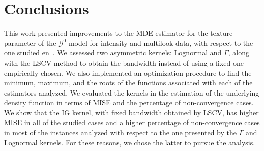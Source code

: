 \documentclass[twocolumn]{svjour3}
\begin{document}
	
	\section{Conclusions}
	\label{conclusion}
	
	This work presented improvements to the MDE estimator for the texture parameter of the $\mathcal{G}^0$ model for intensity and multilook data, with respect to the one studied en~\cite{gambini2015}. 
	We assessed two asymmetric kernels: Lognormal and $\Gamma$, along with the LSCV method to obtain the bandwidth instead of using a fixed one empirically chosen.
	We also implemented an optimization procedure to find the minimum, maximum, and the roots of the functions associated with each of the estimators analyzed.
	We evaluated the kernels in the estimation of the underlying density function in terms of MISE and the percentage of non-convergence cases. 
	We show that the IG kernel, with fixed bandwidth obtained by LSCV, has higher MISE in all of the studied cases and a higher percentage of non-convergence cases in most of the instances analyzed with respect to the one presented by the $\Gamma$ and Lognormal kernels. 
	For these reasons, we chose the latter to pursue the analysis.
	
\end{document}
